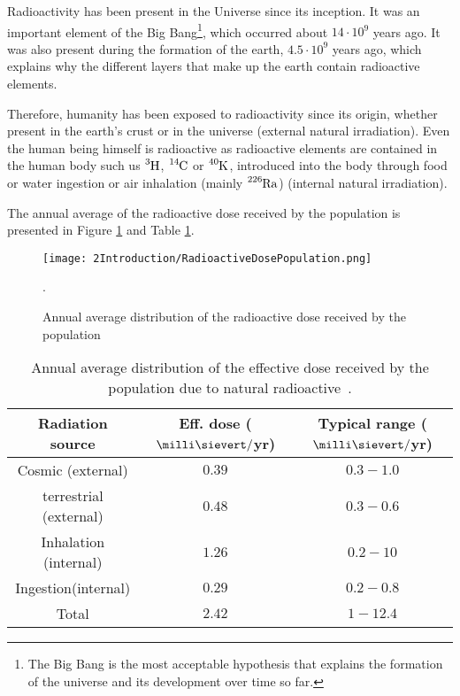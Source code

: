 Radioactivity has been present in the Universe since its inception. It was an important element of the Big Bang\footnote{The Big Bang is the most acceptable hypothesis that explains the formation of the universe and its development over time so far.}, which occurred about $14 \cdot{} 10^9$ years ago. It was also present during the formation of the earth, $4.5 \cdot{} 10^9$ years ago, which explains why the different layers that make up the earth contain radioactive elements. 

Therefore, humanity has been exposed to radioactivity since its origin, whether present in the earth's crust or in the universe (external natural irradiation). Even the human being himself is radioactive as radioactive elements are contained in the human body such us $\ce{^{3}H}$, $\ce{^{14}C}$ or $\ce{^{40}K}$, introduced into the body through food or water ingestion or air inhalation (mainly $\ce{^{226}Ra}$) (internal natural irradiation). 

The annual average of the radioactive dose received by the population is presented in Figure \ref{fig:RadioactiveDosePopulation} and Table \ref{tab:RadioactiveNaturalDosePopulation}.

\begin{figure}[hbtp]
\texttt{[image: 2Introduction/RadioactiveDosePopulation.png]}
\centering
\caption{Annual average distribution of the radioactive dose received by the population~\cite{IAEA}\label{fig:RadioactiveDosePopulation}}.
\end{figure}


\begin{table}[htbp]
\begin{center}
\begin{tabular}{|c|c|c|}
\hline
Radiation source & Eff. dose ($\milli\sievert/$yr) & Typical range ($\milli\sievert/$yr)\\
\hline \hline \hline
Cosmic (external) & $0.39$ & $0.3 - 1.0$ \\ \hline
terrestrial (external) & $0.48$ & $0.3-0.6$ \\ \hline
\hline  
Inhalation (internal) & $1.26$ & $0.2-10$ \\ \hline
Ingestion(internal) & $0.29$ & $0.2-0.8$ \\ \hline
\hline 
Total & $2.42$ & $1-12.4$ \\ \hline
\end{tabular}
\caption{Annual average distribution of the effective dose received by the population due to natural radioactive~\cite{UNSCEAR}\cite{CSN}.}
\label{tab:RadioactiveNaturalDosePopulation}
\end{center}
\end{table}

